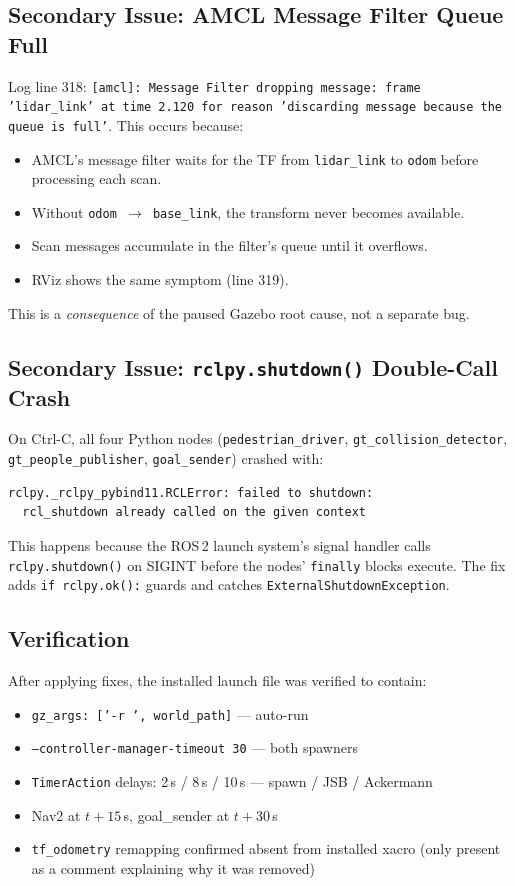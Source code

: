 \documentclass[11pt]{article}
\newcommand{\logentry}[1]{\subsection*{#1}}
\begin{document}
\logentry{Secondary Issue: AMCL Message Filter Queue Full}
Log line 318: \texttt{[amcl]: Message Filter dropping message: frame
'lidar\_link' at time 2.120 for reason 'discarding message because the queue
is full'}.  This occurs because:
\begin{itemize}
  \item AMCL's message filter waits for the TF from \texttt{lidar\_link} to
    \texttt{odom} before processing each scan.
  \item Without \texttt{odom $\to$ base\_link}, the transform never becomes
    available.
  \item Scan messages accumulate in the filter's queue until it overflows.
  \item RViz shows the same symptom (line 319).
\end{itemize}
This is a \emph{consequence} of the paused Gazebo root cause, not a separate
bug.

\logentry{Secondary Issue: \texttt{rclpy.shutdown()} Double-Call Crash}
On Ctrl-C, all four Python nodes (\texttt{pedestrian\_driver},
\texttt{gt\_collision\_detector}, \texttt{gt\_people\_publisher},
\texttt{goal\_sender}) crashed with:
\begin{verbatim}
rclpy._rclpy_pybind11.RCLError: failed to shutdown:
  rcl_shutdown already called on the given context
\end{verbatim}
This happens because the ROS\,2 launch system's signal handler calls
\texttt{rclpy.shutdown()} on SIGINT before the nodes' \texttt{finally} blocks
execute.  The fix adds \texttt{if rclpy.ok():} guards and catches
\texttt{ExternalShutdownException}.

\logentry{Verification}
After applying fixes, the installed launch file was verified to contain:
\begin{itemize}
  \item \texttt{gz\_args: ['-r ', world\_path]} --- auto-run
  \item \texttt{--controller-manager-timeout 30} --- both spawners
  \item \texttt{TimerAction} delays: 2\,s / 8\,s / 10\,s --- spawn / JSB / Ackermann
  \item Nav2 at $t+15$\,s, goal\_sender at $t+30$\,s
  \item \texttt{tf\_odometry} remapping confirmed absent from installed xacro
    (only present as a comment explaining why it was removed)
\end{itemize}

\end{document}
